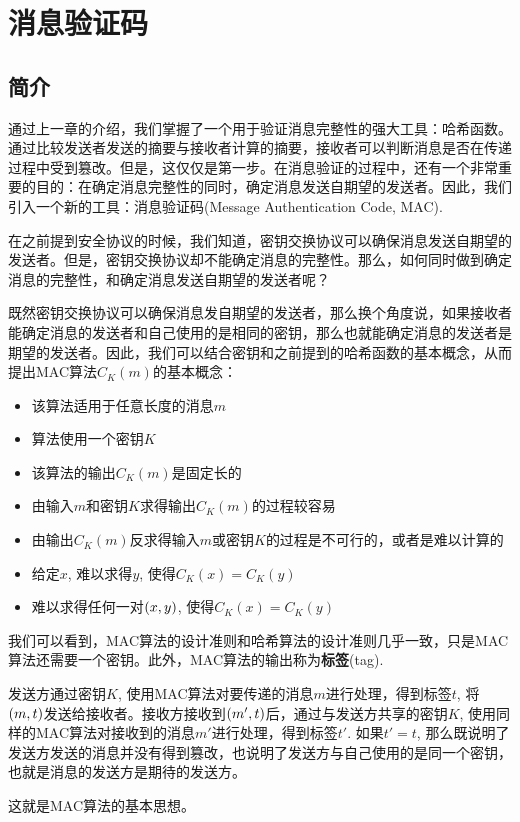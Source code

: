 \chapter{消息验证码}
\section{简介}
通过上一章的介绍，我们掌握了一个用于验证消息完整性的强大工具：哈希函数。通过比较发送者发送的摘要与接收者计算的摘要，接收者可以判断消息是否在传递过程中受到篡改。但是，这仅仅是第一步。在消息验证的过程中，还有一个非常重要的目的：在确定消息完整性的同时，确定消息发送自期望的发送者。因此，我们引入一个新的工具：消息验证码(Message Authentication Code, MAC).\par
在之前提到安全协议的时候，我们知道，密钥交换协议可以确保消息发送自期望的发送者。但是，密钥交换协议却不能确定消息的完整性。那么，如何同时做到确定消息的完整性，和确定消息发送自期望的发送者呢？\par
既然密钥交换协议可以确保消息发自期望的发送者，那么换个角度说，如果接收者能确定消息的发送者和自己使用的是相同的密钥，那么也就能确定消息的发送者是期望的发送者。因此，我们可以结合密钥和之前提到的哈希函数的基本概念，从而提出MAC算法$C_K(m)$的基本概念：
\begin{itemize}
	\item 该算法适用于任意长度的消息$m$
	\item 算法使用一个密钥$K$
	\item 该算法的输出$C_K(m)$是固定长的
	\item 由输入$m$和密钥$K$求得输出$C_K(m)$的过程较容易
	\item 由输出$C_K(m)$反求得输入$m$或密钥$K$的过程是不可行的，或者是难以计算的
	\item 给定$x$, 难以求得$y$, 使得$C_K(x)=C_K(y)$
	\item 难以求得任何一对$\left( {x, y}\right)$, 使得$C_K(x)=C_K(y)$
\end{itemize}

我们可以看到，MAC算法的设计准则和哈希算法的设计准则几乎一致，只是MAC算法还需要一个密钥。此外，MAC算法的输出称为\textbf{标签}(tag).\par
发送方通过密钥$K$, 使用MAC算法对要传递的消息$m$进行处理，得到标签$t$, 将$\left( {m, t}\right)$发送给接收者。接收方接收到$\left( {m', t}\right)$后，通过与发送方共享的密钥$K$, 使用同样的MAC算法对接收到的消息$m'$进行处理，得到标签$t'$. 如果$t'=t$, 那么既说明了发送方发送的消息并没有得到篡改，也说明了发送方与自己使用的是同一个密钥，也就是消息的发送方是期待的发送方。\par
这就是MAC算法的基本思想。